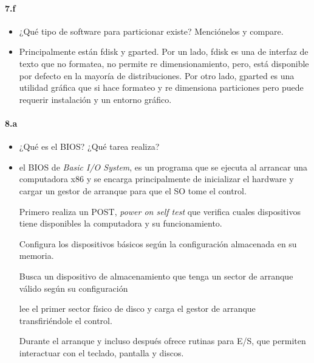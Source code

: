 \documentclass[10pt,a4paper]{paper}
\begin{document}
	
	\paragraph{7.f}
	\begin{itemize}
		\item ¿Qué tipo de software para particionar existe? Menciónelos y compare.
		
		\item Principalmente están fdisk y gparted. Por un lado, fdisk es una de
		interfaz de texto que no formatea, no permite re dimensionamiento, pero, está
		disponible por defecto en la mayoría de distribuciones. Por otro lado, gparted
		es una utilidad gráfica que si hace formateo y re dimensiona particiones pero
		puede requerir instalación y un entorno gráfico.
	\end{itemize}
	
	
	
	\paragraph{8.a}
	\begin{itemize}
		\item ¿Qué es el BIOS? ¿Qué tarea realiza?
		
		\item el BIOS de \textit{Basic I/O System}, es un programa que se ejecuta al
		arrancar una computadora x86 y se encarga principalmente de inicializar el
		hardware y cargar un gestor de arranque para que el SO tome el control.
		
		
		Primero realiza un POST, \textit{power on self test} que verifica cuales
		dispositivos tiene disponibles la computadora y su funcionamiento. 
		
		Configura los dispositivos básicos según la configuración almacenada en su
		memoria.
		
		
		Busca un dispositivo de almacenamiento que tenga un sector de arranque válido
		según su configuración
		
		
		lee el primer sector físico de disco y carga el gestor de arranque
		transfiriéndole el control.
		
		Durante el arranque y incluso después ofrece rutinas para E/S, que permiten
		interactuar con el teclado, pantalla y discos.
	\end{itemize}
	
	
	
\end{document}
